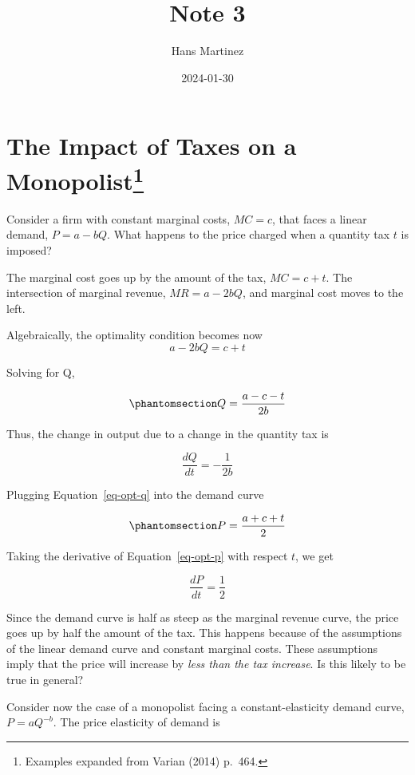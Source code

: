\documentclass[
]{article}
\title{Note 3}
\author{Hans Martinez}
\date{2024-01-30}
\begin{document}
\maketitle

\section[The Impact of Taxes on a Monopolist]{\texorpdfstring{The Impact
of Taxes on a
Monopolist\footnote{Examples expanded from Varian (2014) p.~464.}}{The Impact of Taxes on a Monopolist}}\label{the-impact-of-taxes-on-a-monopolisttaken}

Consider a firm with constant marginal costs, \(MC=c\), that faces a
linear demand, \(P=a-bQ\). What happens to the price charged when a
quantity tax \(t\) is imposed?

The marginal cost goes up by the amount of the tax, \(MC=c+t\). The
intersection of marginal revenue, \(MR=a-2bQ\), and marginal cost moves
to the left.

Algebraically, the optimality condition becomes now \[
a-2bQ=c+t
\]

Solving for Q,

\begin{equation}\phantomsection\label{eq-opt-q}{
Q=\frac{a-c-t}{2b}
}\end{equation}

Thus, the change in output due to a change in the quantity tax is

\[
\frac{dQ}{dt}=-\frac{1}{2b}
\]

Plugging Equation~\ref{eq-opt-q} into the demand curve

\begin{equation}\phantomsection\label{eq-opt-p}{
P=\frac{a+c+t}{2}
}\end{equation}

Taking the derivative of Equation~\ref{eq-opt-p} with respect \(t\), we
get

\[
\frac{dP}{dt}=\frac{1}{2}
\]

Since the demand curve is half as steep as the marginal revenue curve,
the price goes up by half the amount of the tax. This happens because of
the assumptions of the linear demand curve and constant marginal costs.
These assumptions imply that the price will increase by \emph{less than
the tax increase}. Is this likely to be true in general?

Consider now the case of a monopolist facing a constant-elasticity
demand curve, \(P=aQ^{-b}\). The price elasticity of demand is
\end{document}

